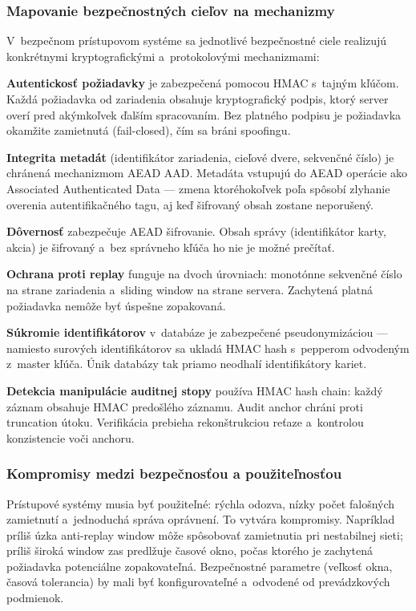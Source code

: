 \subsubsection{Mapovanie bezpečnostných cieľov na mechanizmy}

V~bezpečnom prístupovom systéme sa jednotlivé bezpečnostné ciele realizujú konkrétnymi kryptografickými a~protokolovými mechanizmami\cite{DefenseInDepth}:

\textbf{Autentickosť požiadavky} je zabezpečená pomocou HMAC s~tajným kľúčom\cite{FIPS1981}. Každá požiadavka od zariadenia obsahuje kryptografický podpis, ktorý server overí pred akýmkoľvek ďalším spracovaním. Bez platného podpisu je požiadavka okamžite zamietnutá (fail-closed), čím sa bráni spoofingu.

\textbf{Integrita metadát} (identifikátor zariadenia, cieľové dvere, sekvenčné číslo) je chránená mechanizmom AEAD AAD\cite{RFC5116}. Metadáta vstupujú do AEAD operácie ako Associated Authenticated Data --- zmena ktoréhokoľvek poľa spôsobí zlyhanie overenia autentifikačného tagu, aj keď šifrovaný obsah zostane neporušený.

\textbf{Dôvernosť} zabezpečuje AEAD šifrovanie\cite{RFC8439}. Obsah správy (identifikátor karty, akcia) je šifrovaný a~bez správneho kľúča ho nie je možné prečítať.

\textbf{Ochrana proti replay} funguje na dvoch úrovniach: monotónne sekvenčné číslo na strane zariadenia a~sliding window na strane servera\cite{NIST80053}. Zachytená platná požiadavka nemôže byť úspešne zopakovaná.

\textbf{Súkromie identifikátorov} v~databáze je zabezpečené pseudonymizáciou --- namiesto surových identifikátorov sa ukladá HMAC hash s~pepperom odvodeným z~master kľúča\cite{ISO27001}. Únik databázy tak priamo neodhalí identifikátory kariet.

\textbf{Detekcia manipulácie auditnej stopy} používa HMAC hash chain\cite{SchneierKelsey1999}: každý záznam obsahuje HMAC predošlého záznamu. Audit anchor chráni proti truncation útoku. Verifikácia prebieha rekonštrukciou reťaze a~kontrolou konzistencie voči anchoru.

\subsubsection{Kompromisy medzi bezpečnosťou a použiteľnosťou}

Prístupové systémy musia byť použiteľné: rýchla odozva, nízky počet falošných zamietnutí a~jednoduchá správa oprávnení\cite{SaltzerSchroeder1975}. To vytvára kompromisy. Napríklad príliš úzka anti-replay window môže spôsobovať zamietnutia pri nestabilnej sieti; príliš široká window zas predlžuje časové okno, počas ktorého je zachytená požiadavka potenciálne zopakovateľná. Bezpečnostné parametre (veľkosť okna, časová tolerancia) by mali byť konfigurovateľné a~odvodené od prevádzkových podmienok\cite{NIST80053}.

